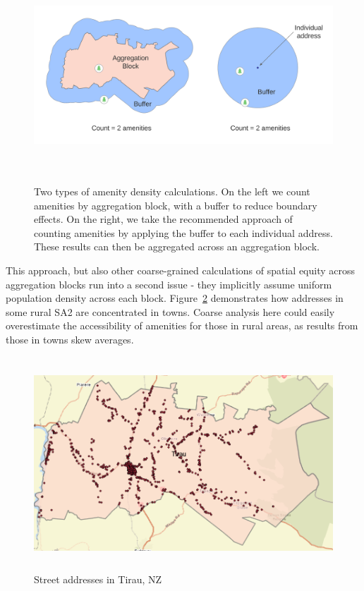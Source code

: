 \documentclass[12pt,a4paper]{article}
\begin{document}
\begin{figure}[!htbp]
	\begin{center}
		\includegraphics[height=80mm]{./figures/amenity_density.png}
		\caption{\centering Two types of amenity density calculations. On the left we count amenities by aggregation block, with a buffer to reduce boundary effects. On the right, we take the recommended approach of counting amenities by applying the buffer to each individual address. These results can then be aggregated across an aggregation block.}
		\label{fig:amenity_density}
	\end{center}
\end{figure}

This approach, but also other coarse-grained calculations of spatial equity across aggregation blocks run into a second issue - they implicitly assume uniform population density across each block. Figure~\ref{fig:tirau} demonstrates how addresses in some rural SA2 are concentrated in towns. Coarse analysis here could easily overestimate the accessibility of amenities for those in rural areas, as results from those in towns skew averages.

\begin{figure}[tt]
	\begin{center}
		\includegraphics[height=80mm]{./figures/tirau.png}
		\caption{Street addresses in Tirau, NZ}
		\label{fig:tirau}
	\end{center}
\end{figure}
\end{document}
